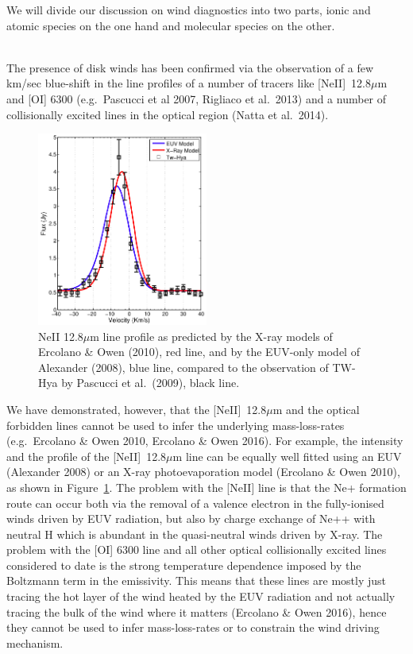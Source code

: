 \documentclass[10pt,fleqn,twoside]{article}
\begin{document}
We will divide our discussion on wind diagnostics into two parts,
ionic and atomic species on the one hand and molecular species on the
other. 

\vspace{0.5em}{\Tcol\bf Ionic and atomic species}\\
The presence of disk winds has been confirmed via the
observation of a few km/sec blue-shift in the line profiles of a
number of tracers like [NeII]~12.8$\mu$m and [OI] 6300 (e.g.\ Pascucci
et al 2007, Rigliaco et al.\ 2013) and a number of collisionally excited lines in the optical
region (Natta et al.\ 2014). 

 \begin{figure}
   \centering
   \includegraphics[width=0.5\textwidth]{neii.jpg}
   \caption{NeII 12.8$\mu$m line profile as predicted by the X-ray
     models of Ercolano \& Owen (2010), red line, and  by the EUV-only
     model of Alexander (2008), blue line, compared to the observation
     of TW-Hya by Pascucci et al.\ (2009), black line.
}
              \label{fig:neii}%
    \end{figure}

We have demonstrated, however, that the  [NeII]~12.8$\mu$m and the
optical forbidden lines 
cannot be used to infer the underlying 
mass-loss-rates (e.g.\ Ercolano \& Owen 2010, Ercolano \& Owen 2016). 
 For example, the intensity and the profile of the [NeII]~12.8$\mu$m line
 can be equally well fitted using an EUV (Alexander 2008) or an X-ray
 photoevaporation model (Ercolano \& Owen 2010), as shown in
 Figure~\ref{fig:neii}. The problem with the 
 [NeII] line is that the Ne+ formation route can occur both via the
 removal of a valence electron in the fully-ionised winds driven by
 EUV radiation, but also by charge exchange of Ne++ with neutral H
 which is abundant in the quasi-neutral winds driven by X-ray. 
The problem with the [OI] 6300 line and all other optical collisionally
excited lines considered to date is the strong temperature dependence
imposed by the Boltzmann term in the emissivity. This means that these
lines are mostly just tracing the hot layer of the wind heated by the
EUV radiation and not actually tracing the bulk of the wind where it
matters (Ercolano \& Owen 2016), hence they
cannot be used to infer mass-loss-rates or to constrain the wind
driving mechanism.   
\end{document}
